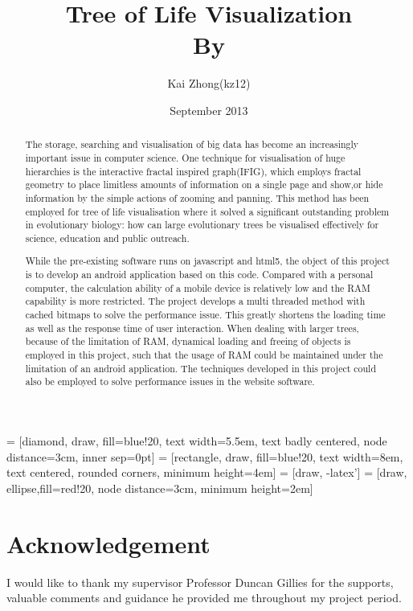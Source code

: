 \documentclass[MSc]{icldt}
\title{Tree of Life Visualization \\ By}
\author{Kai Zhong(kz12)}
\date{September 2013}
\begin{document}
\maketitle

 = [diamond, draw, fill=blue!20, 
    text width=5.5em, text badly centered, node distance=3cm, inner sep=0pt]
 = [rectangle, draw, fill=blue!20, 
    text width=8em, text centered, rounded corners, minimum height=4em]
 = [draw, -latex']
 = [draw, ellipse,fill=red!20, node distance=3cm,
    minimum height=2em]
    
\begin{abstract}

The storage, searching and visualisation of big data has become an increasingly important issue in computer science. One technique for visualisation of huge hierarchies is the interactive fractal inspired graph(IFIG), which employs fractal geometry to place limitless amounts of information on a single page and show,or  hide information by the simple actions of zooming and panning. This method has been employed for tree of life visualisation where it solved a significant outstanding problem in evolutionary biology: how can large evolutionary trees be visualised effectively for science, education and public outreach.

While the pre-existing software runs on javascript and html5, the object of this project is to develop an android application based on this code. Compared with a personal computer, the calculation ability of a mobile device is relatively low and the RAM capability is more restricted. The project develops a multi threaded method with cached bitmaps to solve the performance issue. This greatly shortens the loading time as well as the response time of user interaction. When dealing with larger trees, because of the limitation of RAM, dynamical loading and freeing of objects is employed in this project, such that the usage of RAM could be maintained under the limitation of an android application. 
The techniques developed in this project could also be employed to solve performance issues in the website software.

\end{abstract}

\chapter*{Acknowledgement}

I would like to thank my supervisor Professor Duncan Gillies for the supports, valuable comments and guidance he provided me throughout my project period.
\end{document}
